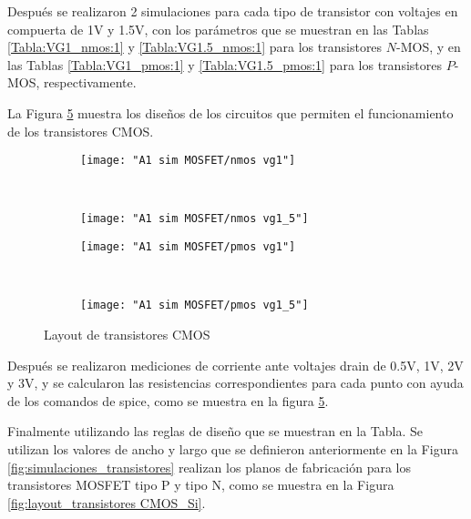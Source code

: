 \documentclass[9pt,technote]{IEEEtran}
\begin{document}
	Después se realizaron 2 simulaciones para cada tipo de transistor con voltajes en compuerta de 1V y 1.5V, con los parámetros que se muestran en las Tablas \ref{Tabla:VG1_nmos:1} y \ref{Tabla:VG1.5_nmos:1} para los transistores $N$-MOS, y en las Tablas \ref{Tabla:VG1_pmos:1} y \ref{Tabla:VG1.5_pmos:1} para los transistores $P$-MOS, respectivamente.
	
	La Figura \ref{fig:layout_transistores CMOS} muestra los diseños de los circuitos que permiten el funcionamiento de los transistores CMOS.
	
	
	\begin{figure}[H]
		\begin{subfigure}[t]{0.45\columnwidth}
			\centering
			\texttt{[image: "A1 sim MOSFET/nmos vg1"]}
			
			\caption{}
			\label{fig:nmos-vg1}
		\end{subfigure}
		~
		\begin{subfigure}[t]{0.45\columnwidth}
			\centering
			\texttt{[image: "A1 sim MOSFET/nmos vg1\_5"]}
			\caption{}
			\label{fig:nmos-vg15}
		\end{subfigure}
		\hfill
		\begin{subfigure}[t]{0.45\columnwidth}
			\centering
			\texttt{[image: "A1 sim MOSFET/pmos vg1"]}
			\caption{}
			\label{fig:pmos-vg1}
		\end{subfigure}
		~
		\hfill
		\begin{subfigure}[t]{0.45\columnwidth}
			\centering
			\texttt{[image: "A1 sim MOSFET/pmos vg1\_5"]}
			\caption{}
			\label{fig:pmos-vg15}
		\end{subfigure}
		\caption{Layout de transistores CMOS}
		\label{fig:layout_transistores CMOS}
	\end{figure}

	Después se realizaron mediciones de corriente ante voltajes drain de 0.5V, 1V, 2V y 3V, y se calcularon las resistencias correspondientes para cada punto con ayuda de los comandos de spice, como se muestra en la figura \ref{fig:layout_transistores CMOS}.
	
	Finalmente utilizando las reglas de diseño que se muestran en la Tabla. Se utilizan los valores de ancho y largo que se definieron anteriormente en la Figura \ref{fig:simulaciones_transistores} realizan los planos de fabricación para los transistores MOSFET tipo P y tipo N, como se muestra en la Figura \ref{fig:layout_transistores CMOS_Si}.
	
\end{document}
